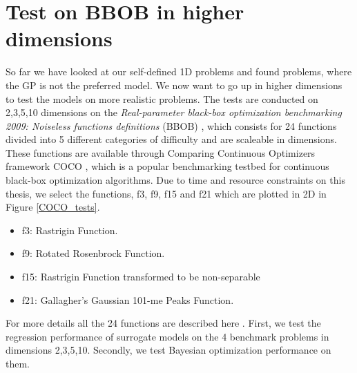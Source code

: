 \section{Test on BBOB in higher dimensions}
So far we have looked at our self-defined 1D problems and found problems, where the GP is not the
preferred model. We now want to go up in higher dimensions to test the models on more realistic
problems. The tests are conducted on 2,3,5,10 dimensions on the \textit{Real-parameter black-box
optimization benchmarking 2009: Noiseless functions definitions} (BBOB) \cite{hansen2009real}, which
consists for 24 functions divided into 5 different categories of difficulty and are scaleable in dimensions. 
These functions are available through Comparing Continuous Optimizers framework COCO \cite{COCO}, which is 
a popular benchmarking testbed for continuous black-box optimization algorithms. Due to time and resource
constraints on this thesis, we select the functions, f3, f9, f15 and f21 which are plotted in 2D in Figure \ref{COCO_tests}.
\begin{itemize}[noitemsep]
  \item f3: Rastrigin Function.
  \item f9: Rotated Rosenbrock Function.
  \item f15: Rastrigin Function transformed to be non-separable
  \item f21: Gallagher’s Gaussian 101-me Peaks Function.
\end{itemize}
For more details all the 24 functions are described here \cite{hansen2009real}. First, we test the
regression performance of surrogate models on the 4 benchmark problems in dimensions 2,3,5,10.
Secondly, we test Bayesian optimization performance on them. 

